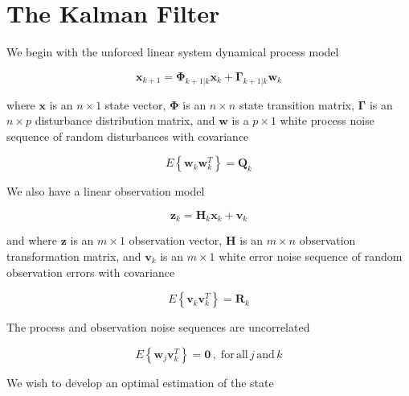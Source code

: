 \section{The Kalman Filter}
\label{The Kalman Filter}

We begin with the unforced linear system dynamical process model

\begin{equation}
    \mathbf{x}_{k+1} = \mathbf{\Phi}_{k+1|k} \mathbf{x}_k + \mathbf{\Gamma}_{k+1|k} \mathbf{w}_k
    \label{eq:unforced-linear-system-dynamical-model}
\end{equation}

where $\mathbf{x}$ is an $n \times 1$ state vector,
$\mathbf{\Phi}$ is an $n \times n$ state transition matrix,
$\mathbf{\Gamma}$ is an $n \times p$ disturbance distribution matrix,
and $\mathbf{w}$ is a $p \times 1$ white process noise sequence of random disturbances with covariance

\begin{equation}
    E \left\{ \mathbf{w}_k \mathbf{w}_k^T \right\} = \mathbf{Q}_k
    \label{eq:process-noise-covariance}
\end{equation}

We also have a linear observation model

\begin{equation}
    \mathbf{z}_k = \mathbf{H}_k \mathbf{x}_k + \mathbf{v}_k
    \label{eq:linear-system-observation-model}
\end{equation}

and where $\mathbf{z}$ is an $m \times 1$ observation vector,
$\mathbf{H}$ is an $m \times n$ observation transformation matrix,
and $\mathbf{v}_k$ is an $m \times 1$ white error noise sequence of random observation errors with covariance

\begin{equation}
    E \left\{ \mathbf{v}_k \mathbf{v}_k^T \right\} = \mathbf{R}_k
    \label{eq:observation-noise-covariance}
\end{equation}

The process and observation noise sequences are uncorrelated

\begin{equation*}
    E \left\{ \mathbf{w}_j \mathbf{v}_k^T \right\} = \mathbf{0} \, , \phantom{.} \mathrm{for} \, \mathrm{all} \, j \, \mathrm{and} \, k
\end{equation*}

We wish to develop an optimal estimation of the state

